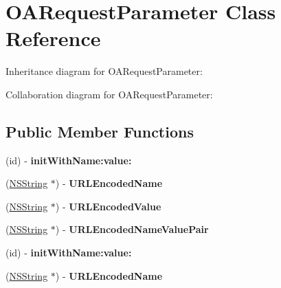 \hypertarget{interface_o_a_request_parameter}{
\section{\-O\-A\-Request\-Parameter \-Class \-Reference}
\label{interface_o_a_request_parameter}
}


\-Inheritance diagram for \-O\-A\-Request\-Parameter\-:


\-Collaboration diagram for \-O\-A\-Request\-Parameter\-:
\subsection*{\-Public \-Member \-Functions}
\begin{DoxyCompactItemize}
\item 
\hypertarget{interface_o_a_request_parameter_ac4f56cea4909dc4f4e63ce314c34c939}{
(id) -\/ {\bfseries init\-With\-Name\-:value\-:}}
\label{interface_o_a_request_parameter_ac4f56cea4909dc4f4e63ce314c34c939}

\item 
\hypertarget{interface_o_a_request_parameter_af9066b1a1bda750974ca881f933c5883}{
(\hyperlink{class_n_s_string}{\-N\-S\-String} $\ast$) -\/ {\bfseries \-U\-R\-L\-Encoded\-Name}}
\label{interface_o_a_request_parameter_af9066b1a1bda750974ca881f933c5883}

\item 
\hypertarget{interface_o_a_request_parameter_ac6364dc825daaa9927a61baf38007678}{
(\hyperlink{class_n_s_string}{\-N\-S\-String} $\ast$) -\/ {\bfseries \-U\-R\-L\-Encoded\-Value}}
\label{interface_o_a_request_parameter_ac6364dc825daaa9927a61baf38007678}

\item 
\hypertarget{interface_o_a_request_parameter_af355e0ae6b5d3b3c4d098754d350e29f}{
(\hyperlink{class_n_s_string}{\-N\-S\-String} $\ast$) -\/ {\bfseries \-U\-R\-L\-Encoded\-Name\-Value\-Pair}}
\label{interface_o_a_request_parameter_af355e0ae6b5d3b3c4d098754d350e29f}

\item 
\hypertarget{interface_o_a_request_parameter_ac4f56cea4909dc4f4e63ce314c34c939}{
(id) -\/ {\bfseries init\-With\-Name\-:value\-:}}
\label{interface_o_a_request_parameter_ac4f56cea4909dc4f4e63ce314c34c939}

\item 
\hypertarget{interface_o_a_request_parameter_af9066b1a1bda750974ca881f933c5883}{
(\hyperlink{class_n_s_string}{\-N\-S\-String} $\ast$) -\/ {\bfseries \-U\-R\-L\-Encoded\-Name}}
\label{interface_o_a_request_parameter_af9066b1a1bda750974ca881f933c5883}


\end{DoxyCompactItemize}
